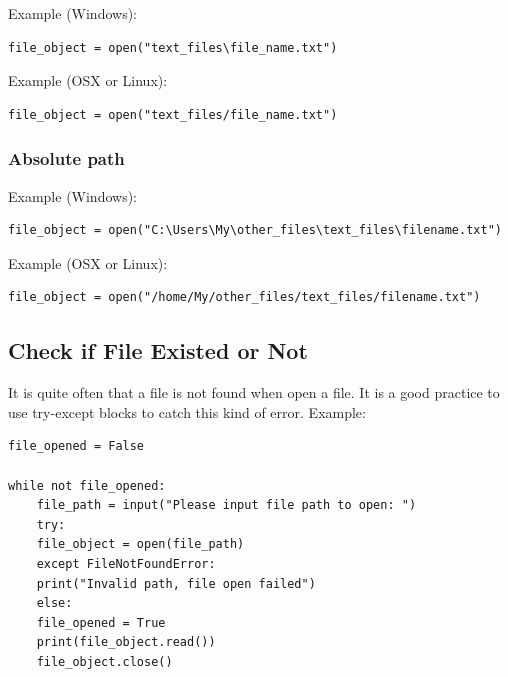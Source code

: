 \documentclass[12pt]{book}
\begin{document}
Example (Windows):
\begin{verbatim}
file_object = open("text_files\file_name.txt")
\end{verbatim}
Example (OSX or Linux):
\begin{verbatim}
file_object = open("text_files/file_name.txt")
\end{verbatim}
\subsubsection{Absolute path}
\label{sec:org94f5f7f}
Example (Windows):
\begin{verbatim}
file_object = open("C:\Users\My\other_files\text_files\filename.txt")
\end{verbatim}
Example (OSX or Linux):
\begin{verbatim}
file_object = open("/home/My/other_files/text_files/filename.txt")
\end{verbatim}
\subsection{Check if File Existed or Not}
\label{sec:org3fc968a}
It is quite often that a file is not found when open a file. It is a good practice to use try-except blocks to catch this kind of error. Example:
\begin{verbatim}
file_opened = False

while not file_opened:
    file_path = input("Please input file path to open: ")
    try:
	file_object = open(file_path)
    except FileNotFoundError:
	print("Invalid path, file open failed")
    else:
	file_opened = True
	print(file_object.read())
	file_object.close()
\end{verbatim}
\end{document}
